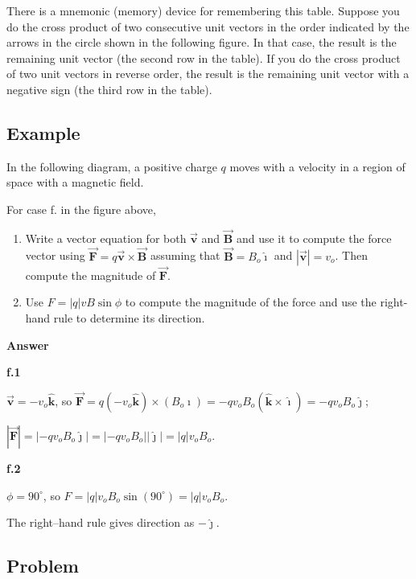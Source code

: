\documentclass{article}
\newcommand{\ihat}[0]{\hat{\boldsymbol{\imath}}}
\newcommand{\jhat}[0]{\hat{\boldsymbol{\jmath}}}
\newcommand{\khat}[0]{\hat{\boldsymbol{k}}}
\newcommand{\bfvec}[1]{\vec{\mathbf{#1}}}
\begin{document}
There is a mnemonic (memory) device for remembering this table. Suppose you do the cross product of two consecutive unit vectors in the order indicated by the arrows in the circle shown in the following figure. In that case, the result is the remaining unit vector (the second row in the table). If you do the cross product of two unit vectors in reverse order, the result is the remaining unit vector with a negative sign (the third row in the table).



\ifsolutions\else
\newpage
\fi

\subsection{Example}

In the following diagram, a positive charge $q$ moves with a velocity in a region of space with a magnetic field.



For case f. in the figure above,

\begin{enumerate}

  \item Write a vector equation for both $\bfvec{v}$ and $\bfvec{B}$ and use it to compute the force vector using $\bfvec{F} = q\bfvec{v}\times\bfvec{B}$ assuming that $\bfvec{B}=B_o\ihat$ and $|\bfvec{v}|=v_o$. Then compute the magnitude of $\bfvec{F}$.

  \item Use $F = |q|vB\sin\phi$ to compute the magnitude of the force and use the right-hand rule to determine its direction.

\end{enumerate}

\textbf{Answer}

\textbf{f.1}

$\bfvec{v}=-v_o\khat$, so $\bfvec{F} = q(-v_o\khat)\times (B_o\ihat)=-qv_oB_o(\khat\times \ihat)=-qv_oB_o\jhat$;

$|\bfvec{F}|=|-qv_oB_o\jhat| = |-qv_oB_o||\jhat|=|q|v_oB_o$.

\textbf{f.2}

$\phi=90^{\circ}$, so $F = |q|v_oB_o\sin(90^{\circ})=|q|v_oB_o$.

The right--hand rule gives direction as $-\jhat$.

\subsection{Problem}
\end{document}
